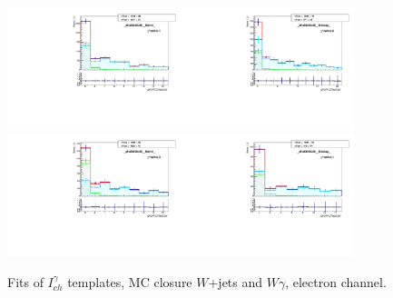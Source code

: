 \begin{figure}[htb]
\begin{center}
   \includegraphics[width=0.45\textwidth]{../figs/figs_v11/ELECTRON_WGamma/MCclosureWjetsPlusWg/c_TEMPL_CHISO_UNblind__phoEt25to30__Barrel__RooFit_MCclosure.pdf}\includegraphics[width=0.45\textwidth]{../figs/figs_v11/ELECTRON_WGamma/MCclosureWjetsPlusWg/c_TEMPL_CHISO_UNblind__phoEt25to30__Endcap__RooFit_MCclosure.pdf}\\
   \includegraphics[width=0.45\textwidth]{../figs/figs_v11/ELECTRON_WGamma/MCclosureWjetsPlusWg/c_TEMPL_CHISO_UNblind__phoEt30to35__Barrel__RooFit_MCclosure.pdf}\includegraphics[width=0.45\textwidth]{../figs/figs_v11/ELECTRON_WGamma/MCclosureWjetsPlusWg/c_TEMPL_CHISO_UNblind__phoEt30to35__Endcap__RooFit_MCclosure.pdf}\\
  \label{fig:templateFits_MCclosureWjetsPlusWg_CHISO_ELECTRON_1}
  \caption{Fits of $I_{ch}^{\gamma}$ templates, MC closure $W$+jets and $W\gamma$, electron channel.}
  \end{center}
\end{figure}

